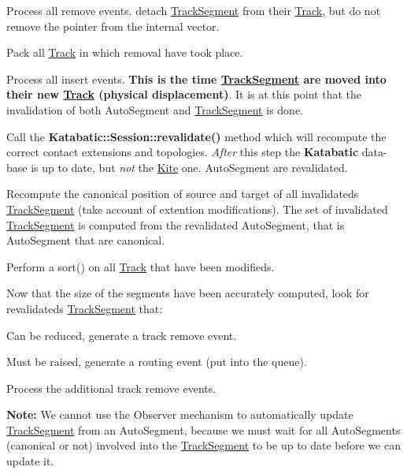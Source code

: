 \begin{DoxyItemize}
\item Process all remove events. detach \hyperlink{classKite_1_1TrackSegment}{Track\-Segment} from their \hyperlink{classKite_1_1Track}{Track}, but do not remove the pointer from the internal {\ttfamily vector}.
\item Pack all \hyperlink{classKite_1_1Track}{Track} in which removal have took place.
\item Process all insert events. {\bfseries This is the time \hyperlink{classKite_1_1TrackSegment}{Track\-Segment} are moved into their new \hyperlink{classKite_1_1Track}{Track} (physical displacement)}. It is at this point that the invalidation of both Auto\-Segment and \hyperlink{classKite_1_1TrackSegment}{Track\-Segment} is done.
\item Call the {\bf Katabatic\-::\-Session\-::revalidate()} method which will recompute the correct contact extensions and topologies. {\itshape After} this step the {\bf Katabatic} data-\/base is up to date, but {\itshape not} the \hyperlink{namespaceKite}{Kite} one. Auto\-Segment are revalidated.
\item Recompute the canonical position of source and target of all invalidateds \hyperlink{classKite_1_1TrackSegment}{Track\-Segment} (take account of extention modifications). The set of invalidated \hyperlink{classKite_1_1TrackSegment}{Track\-Segment} is computed from the revalidated Auto\-Segment, that is Auto\-Segment that are canonical.
\item Perform a sort() on all \hyperlink{classKite_1_1Track}{Track} that have been modifieds.
\item Now that the size of the segments have been accurately computed, look for revalidateds \hyperlink{classKite_1_1TrackSegment}{Track\-Segment} that\-:
\begin{DoxyEnumerate}
\item Can be reduced, generate a track remove event.
\item Must be raised, generate a routing event (put into the queue).
\end{DoxyEnumerate}
\item Process the additional track remove events.
\end{DoxyItemize}

{\bfseries Note\-:} We cannot use the Observer mechanism to automatically update \hyperlink{classKite_1_1TrackSegment}{Track\-Segment} from an Auto\-Segment, because we must wait for all Auto\-Segments (canonical or not) involved into the \hyperlink{classKite_1_1TrackSegment}{Track\-Segment} to be up to date before we can update it.

